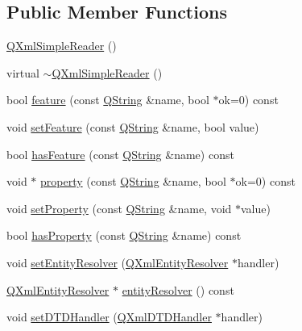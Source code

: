 \subsection*{Public Member Functions}
\begin{DoxyCompactItemize}
\item 
\mbox{\hyperlink{class_q_xml_simple_reader_a4ec163c0a75baf6d86d7124550740372}{Q\+Xml\+Simple\+Reader}} ()
\item 
virtual \mbox{\hyperlink{class_q_xml_simple_reader_a9dba2992f2ef5fe07cd4846dfca0fbc6}{$\sim$\+Q\+Xml\+Simple\+Reader}} ()
\item 
bool \mbox{\hyperlink{class_q_xml_simple_reader_ae6b1a973ea59fc35b75d45ac5e30a303}{feature}} (const \mbox{\hyperlink{class_q_string}{Q\+String}} \&name, bool $\ast$ok=0) const
\item 
void \mbox{\hyperlink{class_q_xml_simple_reader_a7e435e46bfe139249be78d89a89ff629}{set\+Feature}} (const \mbox{\hyperlink{class_q_string}{Q\+String}} \&name, bool value)
\item 
bool \mbox{\hyperlink{class_q_xml_simple_reader_a6066183e6cbbab403e5cdf69a1410157}{has\+Feature}} (const \mbox{\hyperlink{class_q_string}{Q\+String}} \&name) const
\item 
void $\ast$ \mbox{\hyperlink{class_q_xml_simple_reader_a06e5d853a8299d74a0a3adc56e0a02ee}{property}} (const \mbox{\hyperlink{class_q_string}{Q\+String}} \&name, bool $\ast$ok=0) const
\item 
void \mbox{\hyperlink{class_q_xml_simple_reader_abd76c9f09aac5584602b7dd440a9074a}{set\+Property}} (const \mbox{\hyperlink{class_q_string}{Q\+String}} \&name, void $\ast$value)
\item 
bool \mbox{\hyperlink{class_q_xml_simple_reader_ad93428643a263ad7dfc57f321cea65bb}{has\+Property}} (const \mbox{\hyperlink{class_q_string}{Q\+String}} \&name) const
\item 
void \mbox{\hyperlink{class_q_xml_simple_reader_a48dc90b8bdb4e1a0f8474079443f71b0}{set\+Entity\+Resolver}} (\mbox{\hyperlink{class_q_xml_entity_resolver}{Q\+Xml\+Entity\+Resolver}} $\ast$handler)
\item 
\mbox{\hyperlink{class_q_xml_entity_resolver}{Q\+Xml\+Entity\+Resolver}} $\ast$ \mbox{\hyperlink{class_q_xml_simple_reader_a7e754b5b6fc96a4fd477de791c317317}{entity\+Resolver}} () const
\item 
void \mbox{\hyperlink{class_q_xml_simple_reader_a48b3b2f31a8e0436049fa13072b3bec7}{set\+D\+T\+D\+Handler}} (\mbox{\hyperlink{class_q_xml_d_t_d_handler}{Q\+Xml\+D\+T\+D\+Handler}} $\ast$handler)

\end{DoxyCompactItemize}
